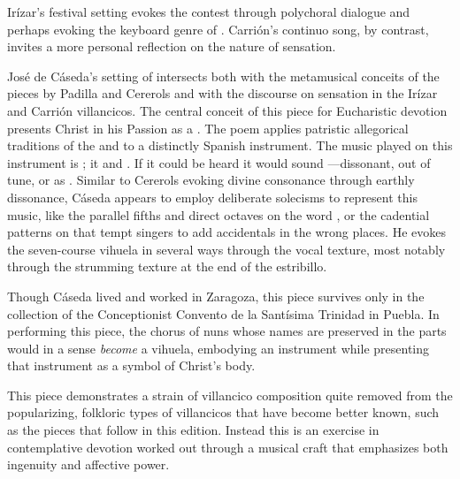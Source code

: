 Irízar's festival setting evokes the contest through polychoral dialogue and 
perhaps evoking the keyboard genre of .%
    \Autocite{Sutton:IberianBatalla}
Carrión's continuo song, by contrast, invites a more personal reflection on the 
nature of sensation.

José de Cáseda's setting of  intersects 
both with the metamusical conceits of the pieces by Padilla and Cererols and 
with the discourse on sensation in the Irízar and Carrión villancicos.
The central conceit of this piece for Eucharistic devotion presents Christ in 
his Passion as a .%
    \Autocite[375--405]{Cashner:PhD}
The poem applies patristic allegorical traditions of the  and 
 to a distinctly Spanish instrument.
The music played on this instrument is ; it 
 and .
If it could be heard it would sound ---dissonant, out of tune, or 
as . 
Similar to Cererols evoking divine consonance through earthly dissonance, 
Cáseda appears to employ deliberate solecisms to represent this 
music, like the parallel fifths and direct octaves on the 
word , or the cadential patterns on 
that tempt singers to add accidentals in the wrong places.
He evokes the seven-course vihuela in several ways through the vocal texture, 
most notably through the strumming texture at the end of the estribillo.

Though Cáseda lived and worked in Zaragoza, this piece survives only in the
collection of the Conceptionist Convento de la Santísima Trinidad in Puebla.%
    \Autocite{Favila:PhD}
In performing this piece, the chorus of nuns whose names are preserved in the 
parts would in a sense \emph{become} a vihuela, embodying an instrument while 
presenting that instrument as a symbol of Christ's body.

This piece demonstrates a strain of villancico composition quite removed from 
the popularizing, folkloric types of villancicos that have become better known,
such as the pieces that follow in this edition.  
Instead this is an exercise in contemplative devotion worked out through a
musical craft that emphasizes both ingenuity and affective power.


